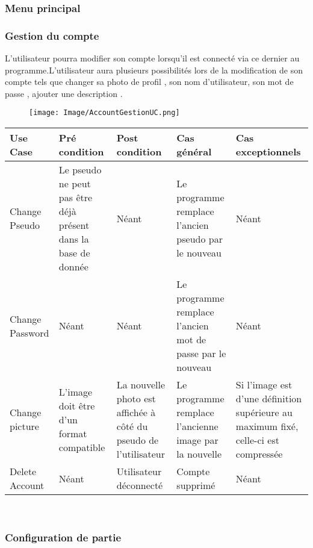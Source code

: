 \documentclass[french, utf8]{article}
\begin{document}
\subsubsection{Menu principal}
\label{sec:MenuPrincipalSystem}

\subsubsection{Gestion du compte}
\label{sec:GestionDeCompte}
L'utilisateur pourra modifier son compte lorsqu'il est connecté via ce dernier au programme.L'utilisateur aura plusieurs possibilités lors de la modification de son compte tels que changer sa photo de profil , son nom d'utilisateur, son mot de passe , ajouter une description .

\begin{figure}[ht]
     \centering
    \texttt{[image: Image/AccountGestionUC.png]}
\end{figure}

\begin{center}
\begin{tabular}{|m{3cm}|m{3cm}|m{3cm}|m{3cm}|m{3cm}|}
\hline  Use Case & Pré condition      &  Post condition  & Cas général & Cas exceptionnels\\

\hline Change Pseudo  & Le pseudo ne peut pas être déjà présent dans la base de donnée & Néant & Le programme remplace l'ancien pseudo par le nouveau & Néant \\
\hline Change Password  & Néant & Néant & Le programme remplace l'ancien mot de passe par le nouveau & Néant \\
\hline Change picture  & L'image doit être d'un format compatible & La nouvelle photo est affichée à côté du pseudo de l'utilisateur & Le programme remplace l'ancienne image par la nouvelle & Si l'image est d'une définition supérieure au maximum fixé, celle-ci est compressée \\
\hline Delete Account  & Néant &  Utilisateur déconnecté& Compte supprimé & Néant \\
\hline
\end{tabular}\\
\end{center}


\subsubsection{Configuration de partie}
\end{document}
